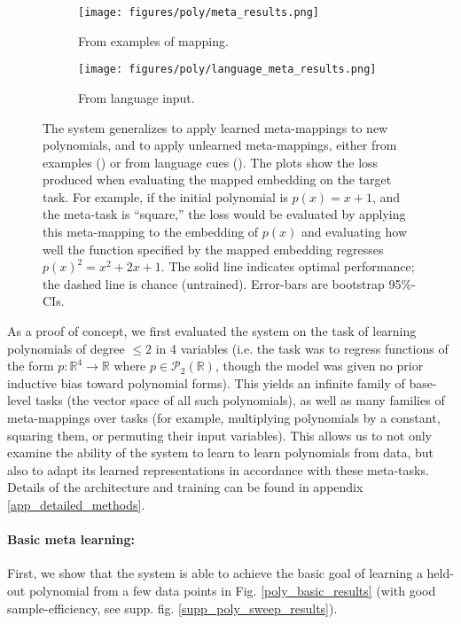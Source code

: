 \documentclass{article}
\begin{document}
\begin{figure}
\centering
\begin{subfigure}{0.5\textwidth}
\texttt{[image: figures/poly/meta\_results.png]}
\caption{From examples of mapping.}
\label{poly_meta_map_results_examples}
\end{subfigure}%
\begin{subfigure}{0.5\textwidth}
\texttt{[image: figures/poly/language\_meta\_results.png]}
\caption{From language input.}
\label{poly_meta_map_results_language}
\end{subfigure}
\caption{The system generalizes to apply learned meta-mappings to new polynomials, and to apply unlearned meta-mappings, either from examples () or from language cues (). The plots show the loss produced when evaluating the mapped embedding on the target task. For example, if the initial polynomial is $p(x) = x + 1$, and the meta-task is ``square,'' the loss would be evaluated by applying this meta-mapping to the embedding of $p(x)$ and evaluating how well the function specified by the mapped embedding regresses $p(x)^2 = x^2 + 2x + 1$. The solid line indicates optimal performance; the dashed line is chance (untrained). Error-bars are bootstrap 95\%-CIs.} 
\label{poly_meta_map_results}
\end{figure}
As a proof of concept, we first evaluated the system on the task of learning polynomials of degree $\leq 2$ in 4 variables (i.e. the task was to regress functions of the form $p: \mathbb{R}^4 \rightarrow \mathbb{R}$ where $p \in \mathcal{P}_2 \left(\mathbb{R}\right)$, though the model was given no prior inductive bias toward polynomial forms). This yields an infinite family of base-level tasks (the vector space of all such polynomials), as well as many families of meta-mappings over tasks (for example, multiplying polynomials by a constant, squaring them, or permuting their input variables). This allows us to not only examine the ability of the system to learn to learn polynomials from data, but also to adapt its learned representations in accordance with these meta-tasks. Details of the architecture and training can be found in appendix \ref{app_detailed_methods}.\par
\vspace{-0.7em}
\paragraph{Basic meta learning:} First, we show that the system is able to achieve the basic goal of learning a held-out polynomial from a few data points in Fig. \ref{poly_basic_results} (with good sample-efficiency, see supp. fig. \ref{supp_poly_sweep_results}). \par 
\vspace{-0.7em}
\end{document}
